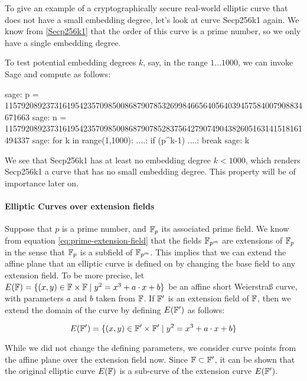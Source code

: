 \begin{example} To give an example of a cryptographically secure real-world elliptic curve that does not have a small embedding degree, let's look at curve Secp256k1 again. We know from \ref{Secp256k1} that the order of this curve is a prime number, so we only have a single embedding degree.

To test potential embedding degrees $k$, say, in the range $1\ldots 1000$, we can invoke Sage and compute as follows:
\begin{sagecommandline}
sage: p = 115792089237316195423570985008687907853269984665640564039457584007908834671663
sage: n = 115792089237316195423570985008687907852837564279074904382605163141518161494337
sage: for k in range(1,1000):
....:     if (p^k-1)%
....:         break
sage: k
\end{sagecommandline}
We see that Secp256k1 has at least no embedding degree $k<1000$, which renders Secp256k1 a curve that has no small embedding degree. This property will be of importance later on.
\end{example}

\paragraph{Elliptic Curves over extension fields} Suppose that $p$ is a prime number, and $\mathbb{F}_p$ its associated prime field. We know from equation \ref{eq:prime-extension-field} that the fields $\mathbb{F}_{p^m}$ are extensions of $\mathbb{F}_p$ in the sense that $\mathbb{F}_{p}$ is a subfield of $\mathbb{F}_{p^m}$. This implies that we can extend the affine plane that an elliptic curve is defined on by changing the base field to any extension field. To be more precise, let 
$E(\mathbb{F})=\{ (x,y)\in \mathbb{F} \times \mathbb{F} \;|\; y^2 = x^3 +a\cdot x +b \}$ be an affine short Weierstraß curve, with parameters $a$ and $b$ taken from $\mathbb{F}$. If $\mathbb{F}'$ is an extension field of $\mathbb{F}$, then we extend the domain of the curve by defining $E(\mathbb{F}')$ as follows:

\begin{equation}\label{elliptic-curve-extension}
E(\mathbb{F}')=\{ (x,y)\in \mathbb{F}' \times \mathbb{F}' \;|\; y^2 = x^3 +a\cdot x +b \}
\end{equation}   

While we did not change the defining parameters, we consider curve points from the affine plane over the extension field now. Since $\mathbb{F}\subset \mathbb{F}'$, it can be shown that the original elliptic curve $E(\mathbb{F})$ is a sub-curve of the extension curve $E(\mathbb{F}')$.

